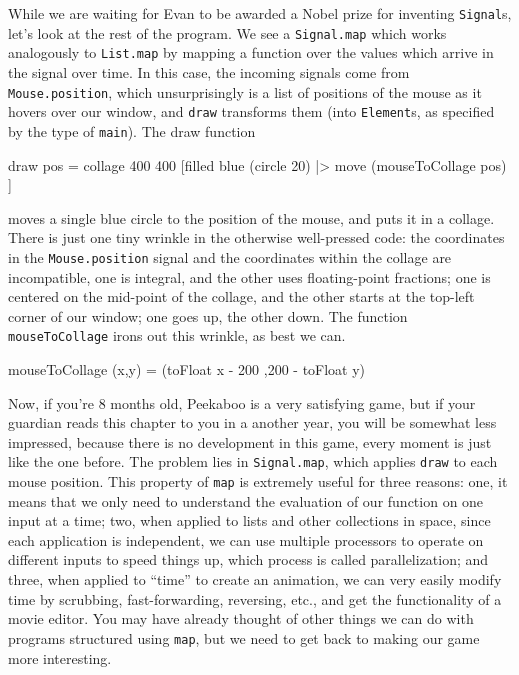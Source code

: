 \documentclass[12pt]{amsbook}
\begin{document}
While we are waiting for Evan to be awarded a Nobel prize for inventing \texttt{Signal}s, let's look at the rest of the program.
We see a \texttt{Signal.map} which works analogously to \texttt{List.map}
by mapping a function over the values which arrive in the signal over time.
In this case, the incoming signals come from \texttt{Mouse.position}, 
which unsurprisingly is a list of positions of the mouse as it hovers over 
our window,
and \texttt{draw} transforms them (into \texttt{Element}s, as specified by the type of \texttt{main}).
The draw function 
\begin{code}
draw pos =
  collage 400 400 [filled blue (circle 20) |> move (mouseToCollage pos)
                  ]
\end{code}
moves a single blue circle to the position of the mouse, and puts it in a collage.
There is just one tiny wrinkle in the otherwise well-pressed code:
the coordinates in the \texttt{Mouse.position} signal and the coordinates
within the collage are incompatible, one is integral, and the other uses
floating-point fractions; one is centered on the mid-point of the collage, and
the other starts at the top-left corner of our window; one goes up, the other down.
The function \texttt{mouseToCollage} irons out this wrinkle, as best we can.
\begin{code}  
mouseToCollage (x,y) = (toFloat x - 200 ,200 - toFloat y)
\end{code}

Now, if you're 8 months old, Peekaboo is a very satisfying game,
but if your guardian reads this chapter to you in a another year,
you will be somewhat less impressed,
because there is no development in this game,
every moment is just like the one before.
The problem lies in \texttt{Signal.map},
which applies \texttt{draw} to each mouse position.
This property of \texttt{map} is extremely useful for
three reasons:  one, it means that we only need to understand the
evaluation of our function on one input at a time;
two, when applied to lists and other collections in space, since each application is independent, we can use multiple processors to operate on different inputs to speed things up, which process is called parallelization;
and three, 
when applied to ``time'' to create an animation, we can very easily modify time by scrubbing, fast-forwarding, reversing, etc., and get the functionality of a movie editor.
You may have already thought of other things we can do with programs structured using \texttt{map}, but we need to get back to making our game more interesting.
\end{document}
